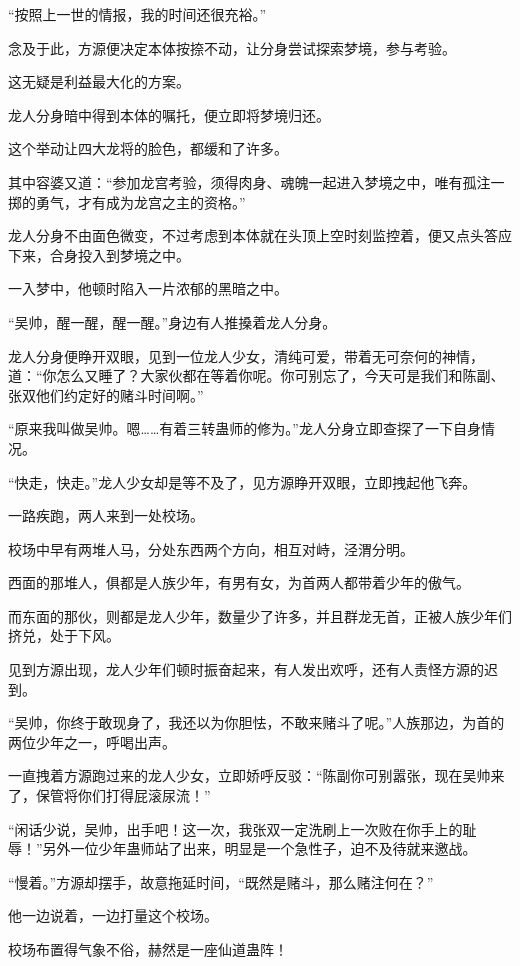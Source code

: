 \begin{this_body}
“按照上一世的情报，我的时间还很充裕。”

念及于此，方源便决定本体按捺不动，让分身尝试探索梦境，参与考验。

这无疑是利益最大化的方案。

龙人分身暗中得到本体的嘱托，便立即将梦境归还。

这个举动让四大龙将的脸色，都缓和了许多。

其中容婆又道：“参加龙宫考验，须得肉身、魂魄一起进入梦境之中，唯有孤注一掷的勇气，才有成为龙宫之主的资格。”

龙人分身不由面色微变，不过考虑到本体就在头顶上空时刻监控着，便又点头答应下来，合身投入到梦境之中。

一入梦中，他顿时陷入一片浓郁的黑暗之中。

“吴帅，醒一醒，醒一醒。”身边有人推搡着龙人分身。

龙人分身便睁开双眼，见到一位龙人少女，清纯可爱，带着无可奈何的神情，道：“你怎么又睡了？大家伙都在等着你呢。你可别忘了，今天可是我们和陈副、张双他们约定好的赌斗时间啊。”

“原来我叫做吴帅。嗯……有着三转蛊师的修为。”龙人分身立即查探了一下自身情况。

“快走，快走。”龙人少女却是等不及了，见方源睁开双眼，立即拽起他飞奔。

一路疾跑，两人来到一处校场。

校场中早有两堆人马，分处东西两个方向，相互对峙，泾渭分明。

西面的那堆人，俱都是人族少年，有男有女，为首两人都带着少年的傲气。

而东面的那伙，则都是龙人少年，数量少了许多，并且群龙无首，正被人族少年们挤兑，处于下风。

见到方源出现，龙人少年们顿时振奋起来，有人发出欢呼，还有人责怪方源的迟到。

“吴帅，你终于敢现身了，我还以为你胆怯，不敢来赌斗了呢。”人族那边，为首的两位少年之一，呼喝出声。

一直拽着方源跑过来的龙人少女，立即娇呼反驳：“陈副你可别嚣张，现在吴帅来了，保管将你们打得屁滚尿流！”

“闲话少说，吴帅，出手吧！这一次，我张双一定洗刷上一次败在你手上的耻辱！”另外一位少年蛊师站了出来，明显是一个急性子，迫不及待就来邀战。

“慢着。”方源却摆手，故意拖延时间，“既然是赌斗，那么赌注何在？”

他一边说着，一边打量这个校场。

校场布置得气象不俗，赫然是一座仙道蛊阵！


\end{this_body}
